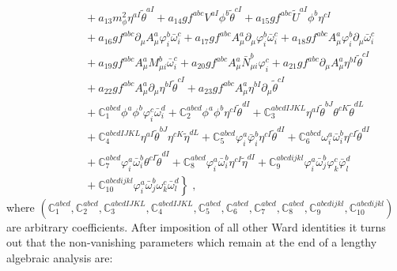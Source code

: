 \begin{appendix}
\begin{eqnarray}
\nonumber \\
&&
\phantom{\int d^{4}x\;}
+ a_{13}m_{\phi}^{2}\eta^{aI}\tilde{\theta}^{aI}
+ a_{14}gf^{abc}V^{aI}\phi^{b}\tilde{\theta}^{cI}
+ a_{15}gf^{abc}\tilde{U}^{aI}\phi^{b}\eta^{cI}
\nonumber \\
&&
\phantom{\int d^{4}x\;}
+ a_{16}gf^{abc}\partial_{\mu}A^{a}_{\mu}\varphi^{b}_{i}\bar{\omega}^{c}_{i}
+ a_{17}gf^{abc}A^{a}_{\mu}\partial_{\mu}\varphi^{b}_{i}\bar{\omega}^{c}_{i}
+ a_{18}gf^{abc}A^{a}_{\mu}\varphi^{b}_{i}\partial_{\mu}\bar{\omega}^{c}_{i}
\nonumber \\
&&
\phantom{\int d^{4}x\;}
+ a_{19}gf^{abc}A^{a}_{\mu}M^{b}_{\mu i}\bar{\omega}^{c}_{i}
+ a_{20}gf^{abc}A^{a}_{\mu}\bar{N}^{b}_{\mu i}\varphi^{c}_{i}
+ a_{21}gf^{abc}\partial_{\mu}A^{a}_{\mu}\eta^{bI}\tilde{\theta}^{cI}
\nonumber \\
&&
\phantom{\int d^{4}x\;}
+ a_{22}gf^{abc}A^{a}_{\mu}\partial_{\mu}\eta^{bI}\tilde{\theta}^{cI}
+ a_{23}gf^{abc}A^{a}_{\mu}\eta^{bI}\partial_{\mu}\tilde{\theta}^{cI}
\nonumber \\
&&
\phantom{\int d^{4}x\;}
+\mathbb{C}^{abcd}_{1}\phi^{a}\phi^{b}\varphi^{c}_{i}\bar{\omega}^{d}_{i}
+ \mathbb{C}^{abcd}_2\phi^{a}\phi^{b}\eta^{cI}\tilde{\theta}^{dI}
+ \mathbb{C}^{abcdIJKL}_3\eta^{aI}\tilde{\theta}^{bJ}\theta^{cK}\tilde{\theta}^{dL}
\nonumber \\
&&
\phantom{\int d^{4}x\;}
+ \mathbb{C}^{abcdIJKL}_4\eta^{aI}\tilde{\theta}^{bJ}\eta^{cK}\tilde{\eta}^{dL}
+ \mathbb{C}^{abcd}_5\varphi^{a}_{i}\bar{\varphi}^{b}_{i}\eta^{cI}\tilde{\theta}^{dI}
+ \mathbb{C}^{abcd}_6\omega^{a}_{i}\bar{\omega}^{b}_{i}\eta^{cI}\tilde{\theta}^{dI}
\nonumber \\
&&
\phantom{\int d^{4}x\;}
+ \mathbb{C}^{abcd}_7\varphi^{a}_{i}\bar{\omega}^{b}_{i}\theta^{cI}\tilde{\theta}^{dI}
+\mathbb{C}^{abcd}_8\varphi^{a}_{i}\bar{\omega}^{b}_{i}\eta^{cI}\tilde{\eta}^{dI}
+ \mathbb{C}^{abcdijkl}_9\varphi^{a}_{i}\bar{\omega}^{b}_{j}\varphi^{c}_{k}\bar{\varphi}^{d}_{l}
\nonumber \\
&&
\phantom{\int d^{4}x\;}
+ \left. \mathbb{C}^{abcdijkl}_{10}\varphi^{a}_{i}\bar{\omega}^{b}_{j}\omega^{c}_{k}\bar{\omega}^{d}_{l}
\right\}\;,
\end{eqnarray}
where $\left( \mathbb{C}^{abcd}_{1}, \mathbb{C}^{abcd}_2, \mathbb{C}^{abcdIJKL}_3, \mathbb{C}^{abcdIJKL}_4, \mathbb{C}^{abcd}_5, \mathbb{C}^{abcd}_6, \mathbb{C}^{abcd}_7, \mathbb{C}^{abcd}_8,  \mathbb{C}^{abcdijkl}_9, \mathbb{C}^{abcdijkl}_{10} \right)$ are arbitrary coefficients. After imposition of all other Ward identities it turns out that  the non-vanishing parameters which remain at the end of a lengthy algebraic analysis are:  

\end{appendix}
